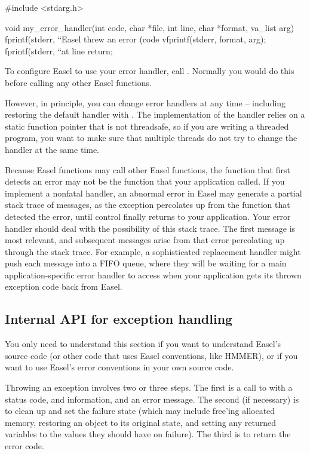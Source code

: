 \begin{cchunk}
#include <stdarg.h>

void
my_error_handler(int code, char *file, int line, char *format, va_list arg)
{
  fprintf(stderr, ``Easel threw an error (code %
  vfprintf(stderr, format, arg);
  fprintf(stderr, ``at line %
  return;
}
\end{cchunk}

To configure Easel to use your error handler, call
. Normally you
would do this before calling any other Easel functions.

However, in principle, you can change error handlers at any time --
including restoring the default handler with
.  The implementation of
the handler relies on a static function pointer that is not
threadsafe, so if you are writing a threaded program, you want to make
sure that multiple threads do not try to change the handler at the
same time.

Because Easel functions may call other Easel functions, the function
that first detects an error may not be the function that your
application called.  If you implement a nonfatal handler, an abnormal
error in Easel may generate a partial stack trace of
 messages, as the exception percolates up from
the function that detected the error, until control finally returns to
your application. Your error handler should deal with the possibility
of this stack trace. The first  message is most
relevant, and subsequent messages arise from that error percolating up
through the stack trace.  For example, a sophisticated replacement
 handler might push each 
message into a FIFO queue, where they will be waiting for a main
application-specific error handler to access when your application
gets its thrown exception code back from Easel.

\subsection{Internal API for exception handling}

You only need to understand this section if you want to understand
Easel's source code (or other code that uses Easel conventions, like
HMMER), or if you want to use Easel's error conventions in your own
source code.

Throwing an exception involves two or three steps. The first is a call
to  with a status code,  and
 information, and an error message. The second (if
necessary) is to clean up and set the failure state (which may include
free'ing allocated memory, restoring an object to its original state,
and setting any returned variables to the values they should have on
failure). The third is to return the error code.

